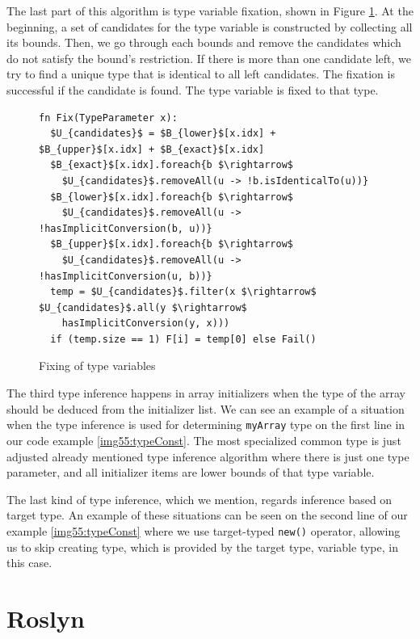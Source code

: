 The last part of this algorithm is type variable fixation, shown in Figure \ref{img73:methodTypeInference4}.
At the beginning, a set of candidates for the type variable is constructed by collecting all its bounds. 
Then, we go through each bounds and remove the candidates which do not satisfy the bound’s restriction. 
If there is more than one candidate left, we try to find a unique type that is identical to all left candidates.
The fixation is successful if the candidate is found.
The type variable is fixed to that type.
\par
\begin{figure}
\begin{lstlisting}[style=myAlgo, mathescape=true]
fn Fix(TypeParameter x):
  $U_{candidates}$ = $B_{lower}$[x.idx] + $B_{upper}$[x.idx] + $B_{exact}$[x.idx]
  $B_{exact}$[x.idx].foreach{b $\rightarrow$ 
    $U_{candidates}$.removeAll(u -> !b.isIdenticalTo(u))}
  $B_{lower}$[x.idx].foreach{b $\rightarrow$ 
    $U_{candidates}$.removeAll(u -> !hasImplicitConversion(b, u))}
  $B_{upper}$[x.idx].foreach{b $\rightarrow$ 
    $U_{candidates}$.removeAll(u -> !hasImplicitConversion(u, b))}
  temp = $U_{candidates}$.filter(x $\rightarrow$ $U_{candidates}$.all(y $\rightarrow$ 
    hasImplicitConversion(y, x)))
  if (temp.size == 1) F[i] = temp[0] else Fail()
\end{lstlisting}
\caption{Fixing of type variables}
\label{img73:methodTypeInference4}
\end{figure}
\par
{}
The third type inference happens in array initializers when the type of the array should be deduced from the initializer list.
We can see an example of a situation when the type inference is used for determining \texttt{myArray} type on the first line in our code example \ref{img55:typeConst}.
The most specialized common type is just adjusted already mentioned type inference algorithm where there is just one type parameter, and all initializer items are lower bounds of that type variable.
\par
{}
The last kind of type inference, which we mention, regards inference based on target type.
An example of these situations can be seen on the second line of our example \ref{img55:typeConst} where we use target-typed \texttt{new()} operator, allowing us to skip creating type, which is provided by the target type, variable type, in this case.

\section{Roslyn}


